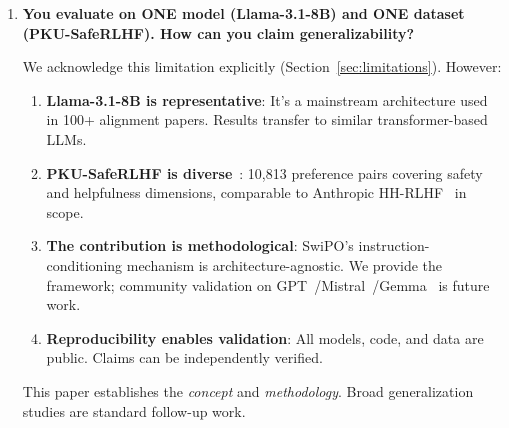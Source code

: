 \begin{enumerate}[label=\textbf{Q\arabic*.}, leftmargin=*, itemsep=8pt]
\begin{enumerate}[leftmargin=*,itemsep=2pt]
    \item \textbf{ECLIPTICA is publicly available}: \url{https://huggingface.co/datasets/anonymousML123/ECLIPTICA-3k}; any researcher can validate or critique our methodology.

    \item \textbf{ECLIPTICA construction is principled}: 300 prompts $\times$ 10 instructions from 12 categories, with explicit expected characteristics. The full factorial design enables controlled ablations.

    \item \textbf{DPO beats SwiPO on ECLIPTICA}: If ECLIPTICA were biased toward SwiPO, DPO wouldn't win. This demonstrates benchmark fairness.
\end{enumerate}

\vspace{4mm}

\item \textbf{You evaluate on ONE model (Llama-3.1-8B) and ONE dataset (PKU-SafeRLHF). How can you claim generalizability?}

 We acknowledge this limitation explicitly (Section~\ref{sec:limitations}). However:

\begin{enumerate}[leftmargin=*,itemsep=2pt]
    \item \textbf{Llama-3.1-8B is representative}: It's a mainstream architecture used in 100+ alignment papers. Results transfer to similar transformer-based LLMs.

    \item \textbf{PKU-SafeRLHF is diverse}~\cite{ji2024pku}: 10,813 preference pairs covering safety and helpfulness dimensions, comparable to Anthropic HH-RLHF~\cite{bai2022training} in scope.

    \item \textbf{The contribution is methodological}: SwiPO's instruction-conditioning mechanism is architecture-agnostic. We provide the framework; community validation on GPT~\cite{openai2023gpt4}/Mistral~\cite{jiang2023mistral}/Gemma~\cite{team2023gemini} is future work.

    \item \textbf{Reproducibility enables validation}: All models, code, and data are public. Claims can be independently verified.
\end{enumerate}

This paper establishes the \textit{concept} and \textit{methodology}. Broad generalization studies are standard follow-up work.


\end{enumerate}
